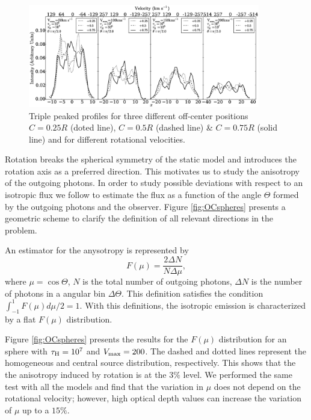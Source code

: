\documentclass{emulateapj}
\newcommand{\kms}{{\ifmmode{{\mathrm{\,km\ s}^{-1}}}\else{\,km~s$^{-1}$}\fi}}
\begin{document}
\begin{figure}
\begin{center}
\includegraphics[width=0.90\textwidth]{f11.eps}
\end{center}
\caption{Triple peaked profiles for three different off-center positions
  $C=0.25R$ (doted line), $C=0.5R$ (dashed line) \& $C=0.75R$ (solid
  line) and for different rotational velocities.  
   \label{fig:3p_profiles}} 
\end{figure}


Rotation breaks the spherical symmetry of the static model and
introduces the rotation axis as a preferred direction. This motivates
us to study the anisotropy of the outgoing photons. In order to study
possible deviations with respect to an isotropic flux we follow
\cite{Zheng2013} to estimate the flux as a function of the angle
$\Theta$ formed by the outgoing photons and the observer. Figure
\ref{fig:OCspheres} presents a geometric scheme to clarify the
definition of all relevant directions in the problem.

An estimator for the anysotropy is represented by
%
\begin{equation}
F(\mu) = \frac{2\Delta N}{N\Delta \mu}, 
\end{equation} 
%
where $\mu=\cos\Theta$, $N$ is the total number of outgoing photons,
$\Delta N$ is the number of photons in a angular bin $\Delta
\Theta$. This definition satisfies the condition
$\int_{-1}^{1}F(\mu)d\mu/2=1$.  With this definitions, the isotropic
emission is characterized by a flat $F(\mu)$ distribution. 


Figure \ref{fig:OCspheres} presents the results for the $F(\mu)$
distribution for an sphere with $\tau_{\rm H}=10^{7}$ and $V_{\rm
  max}=200$\kms. The dashed and dotted lines represent the homogeneous
and central source distribution, respectively. This shows that the
the  anisotropy induced by rotation is at the $3\%$ level. We
performed the same test with all the models and find that the
variation in $\mu$ does not depend on the rotational velocity;
however, high optical depth values can increase the variation of
$\mu$ up to a $15\%$. 
\end{document}

